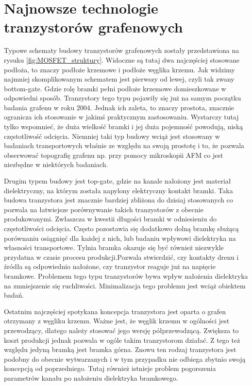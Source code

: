 	\section{Najnowsze technologie tranzystorów grafenowych}

	Typowe schematy budowy tranzystorów grafenowych zostały przedstawiona na rysuku \ref{fig:MOSFET_struktury}. 
	Widoczne są tutaj dwa najczęściej stosowane podłoża, to znaczy podłoże krzemowe i podłoże węglika krzemu.
	Jak widzimy najmniej skomplikowanym schematem jest pierwszy od lewej, czyli tak zwany bottom-gate. 
	Gdzie rolę bramki pełni podłoże krzemowe domieszkowane w odpowiedni sposób. Tranzystory tego typu 
	pojawiły się już na samym początku badania grafenu w roku 2004. Jednak ich zaleta, to znaczy prostota, znacznie
	ogranicza ich stosowanie w jakimś praktycznym zastosowaniu. Wystarczy tutaj tylko wspomnieć, że duża wielkość
	bramki i jej duża pojemność powodują, niską częstotliwość odcięcia. Niemniej taki typ budowy wciąż jest 
	stosowany w badaniach transportowych właśnie ze względu na swoją prostotę i to, że pozwala obserwować topografię
	grafenu np. przy pomocy mikroskopii AFM co jest niezbędne w niektórych badaniach.

	Drugim typem budowy jest top-gate, gdzie na kanale nałożony jest materiał dielektryczny, na którym została napylony
	elektryczny kontakt bramki. Taka budowa tranzystora jest znacznie bardziej zbliżona do dzisiaj stosowanych co 
	pozwala na łatwiejsze porównywanie takich tranzystorów z obecnie produkowanymi. Zwłaszcza w kwestii długości bramki
	w odniesieniu do częstotliwości odcięcia. Często pozostawia się dodatkowo dolną bramkę służącą porównaniu 
	osiągnięć dla każdej z nich, lub badaniu wpływowi dielektryka na własności transportowe. Tylnia bramka okazuje się
	być również niezwykle przydatna w czasie procesu produkcji.Pozwala stwierdzić, czy kontakty
	drenu i źródła są odpowiednio nałożone, czy tranzystor reaguje już na napięcie bramkowe.
	Problemem tego typu tranzystorów bywa wpływ nałożenia dielektryka na zmniejszenie się ruchliwości. Minimalizacja
	tego problemu jest wciąż obiektem badań.

	Ostatnim najczęściej spotykana koncepcja  tranzystora jest oparta o grafen otrzymany z węgliku krzemu. Ważne jest,
	że węglik krzemu w ogólności jest przewodzący, dlatego należy stosować jego wersję półprzewodzącą. Zwiększa to 
	koszt produkcji jednak pozwala w ogóle takim tranzystorom działać. Z tego też względu jedyną bramką jest bramka
	górna. Znowu ten rodzaj tranzystora jest podobny do obecnie wytwarzanych i w tym przypadku nie odbiega zbytnio swoją
	koncepcją od poprzedniego. Tutaj również istnieje problem pogorszenia parametrów kanału po nałożeniu dielektryka 
	bramkowego.

